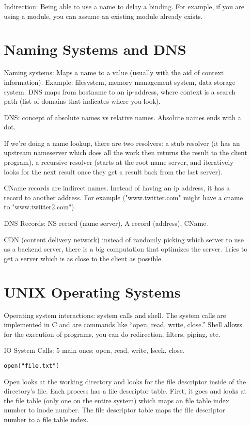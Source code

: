 \documentclass[psamsfonts]{amsart}
\begin{document}
Indirection: Being able to use a name to delay a binding. For example, if you are using a module, you can assume an existing module already exists.

\section{Naming Systems and DNS}

Naming systems: Maps a name to a value (usually with the aid of context information). Example: filesystem, memory management system, data storage system. DNS maps from hostname to an ip-address, where context is a search path (list of domains that indicates where you look).

DNS: concept of absolute names vs relative names. Absolute names ends with a dot.

If we're doing a name lookup, there are two resolvers: a stub resolver (it has an upstream nameserver which does all the work then returns the result to the client program), a recursive resolver (starts at the root name server, and iteratively looks for the next result once they get a result back from the last server). 

CName records are indirect names. Instead of having an ip address, it has a record to another address. For example ("www.twitter.com" might have a cname to "www.twitter2.com"). 

DNS Records: NS record (name server), A record (address), CName.

CDN (content delivery network) instead of randomly picking which server to use as a backend server, there is a big computation that optimizes the server. Tries to get a server which is as close to the client as possible.

\section{UNIX Operating Systems}

Operating system interactions: system calls and shell. The system calls are implemented in C and are commands like ``open, read, write, close.'' Shell allows for the execution of programs, you can do redirection, filters, piping, etc.

IO System Calls: 5 main ones: open, read, write, lseek, close.

\begin{verbatim}
open("file.txt")
\end{verbatim}

Open looks at the working directory and looks for the file descriptor inside of the directory's file. Each process has a file descriptor table. First, it goes and looks at the file table (only one on the entire system) which maps an file table index number to inode number. The file descriptor table maps the file descriptor number to a file table index.
\end{document}
